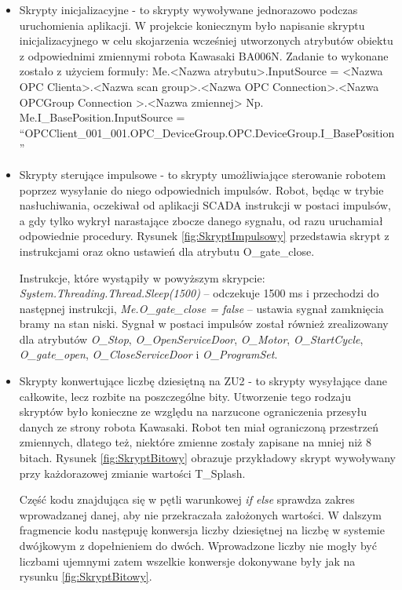 \begin{itemize}
	\item Skrypty inicjalizacyjne - to skrypty wywoływane jednorazowo podczas uruchomienia aplikacji. W projekcie koniecznym było napisanie skryptu inicjalizacyjnego w celu  skojarzenia wcześniej utworzonych atrybutów obiektu z odpowiednimi zmiennymi robota Kawasaki BA006N. Zadanie to wykonane zostało z użyciem formuły:
	Me.<Nazwa atrybutu>.InputSource = <Nazwa OPC Clienta>.<Nazwa scan group>.<Nazwa OPC Connection>.<Nazwa OPCGroup Connection >.<Nazwa zmiennej>
	Np. 
	Me.I\_BasePosition.InputSource = “OPCClient\_001\_001.OPC\_DeviceGroup.OPC.DeviceGroup.I\_BasePosition”
	
	\item Skrypty sterujące impulsowe - to skrypty umożliwiające sterowanie robotem poprzez wysyłanie do niego odpowiednich impulsów. Robot, będąc w trybie nasłuchiwania, oczekiwał od aplikacji SCADA instrukcji w postaci impulsów, a gdy tylko wykrył narastające zbocze danego sygnału, od razu uruchamiał odpowiednie procedury. Rysunek \ref{fig:SkryptImpulsowy} przedstawia skrypt z instrukcjami oraz okno ustawień dla atrybutu O\_gate\_close.
	
	
	Instrukcje, które wystąpiły w powyższym skrypcie:
	\textit{System.Threading.Thread.Sleep(1500)} – odczekuje 1500 ms i przechodzi do następnej instrukcji,
	\textit{Me.O\_gate\_close = false} – ustawia sygnał zamknięcia bramy na stan niski.
	Sygnał w postaci impulsów został również zrealizowany dla atrybutów \textit{O\_Stop}, \textit{O\_OpenServiceDoor}, \textit{O\_Motor}, \textit{O\_StartCycle}, \textit{O\_gate\_open}, \textit{O\_CloseServiceDoor} i \textit{O\_ProgramSet}.
	
	\item Skrypty konwertujące liczbę dziesiętną na ZU2 - to skrypty wysyłające dane całkowite, lecz rozbite na poszczególne bity. Utworzenie tego rodzaju skryptów było konieczne ze względu na narzucone ograniczenia przesyłu danych ze strony robota Kawasaki. Robot ten miał ograniczoną przestrzeń zmiennych, dlatego też, niektóre zmienne zostały zapisane na mniej niż 8 bitach. Rysunek \ref{fig:SkryptBitowy} obrazuje przykładowy skrypt wywoływany przy każdorazowej zmianie wartości T\_Splash.
	

	Część kodu znajdująca się w pętli warunkowej \textit{if else} sprawdza zakres wprowadzanej danej, aby nie przekraczała założonych wartości. W dalszym fragmencie kodu następuję konwersja liczby dziesiętnej na liczbę w systemie dwójkowym z dopełnieniem do dwóch. Wprowadzone liczby nie mogły być liczbami ujemnymi zatem wszelkie konwersje dokonywane były jak na rysunku \ref{fig:SkryptBitowy}.
	

\end{itemize}
